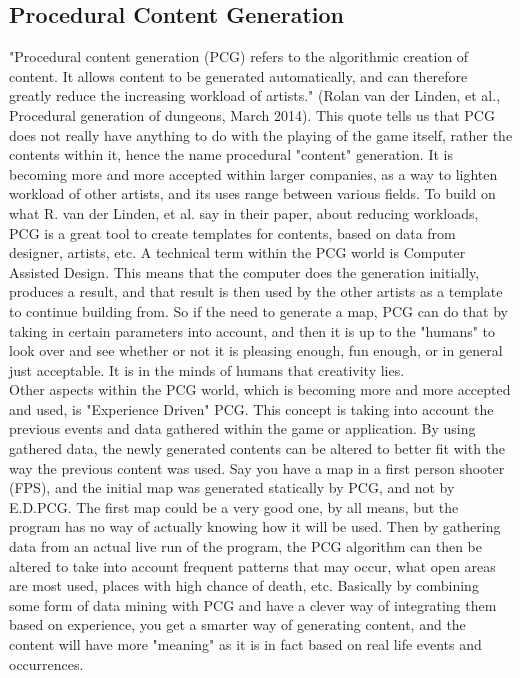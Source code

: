 \subsection{Procedural Content Generation}
"Procedural content generation (PCG) refers to the algorithmic creation of content. It allows content to be generated automatically, and can therefore greatly reduce the increasing workload of artists." (Rolan van der Linden, et al., Procedural generation of dungeons, March 2014).
This quote tells us that PCG does not really have anything to do with the playing of the game itself, rather the contents within it, hence the name procedural "content" generation. It is becoming more and more accepted within larger companies, as a way to lighten workload of other artists, and its uses range between various fields.
To build on what R. van der Linden, et al. say in their paper, about reducing workloads, PCG is a great tool to create templates for contents, based on data from designer, artists, etc. A technical term within the PCG world is Computer Assisted Design. This means that the computer does the generation initially, produces a result, and that result is then used by the other artists as a template to continue building from. So if the need to generate a map, PCG can do that by taking in certain parameters into account, and then it is up to the "humans" to look over and see whether or not it is pleasing enough, fun enough, or in general just acceptable. It is in the minds of humans that creativity lies. \\

Other aspects within the PCG world, which is becoming more and more accepted and used, is "Experience Driven" PCG. This concept is taking into account the previous events and data gathered within the game or application. By using gathered data, the newly generated contents can be altered to better fit with the way the previous content was used. Say you have a map in a first person shooter (FPS), and the initial map was generated statically by PCG, and not by E.D.PCG. The first map could be a very good one, by all means, but the program has no way of actually knowing how it will be used. Then by gathering data from an actual live run of the program, the PCG algorithm can then be altered to take into account frequent patterns that may occur, what open areas are most used, places with high chance of death, etc. Basically by combining some form of data mining with PCG and have a clever way of integrating them based on experience, you get a smarter way of generating content, and the content will have more "meaning" as it is in fact based on real life events and occurrences.\\

